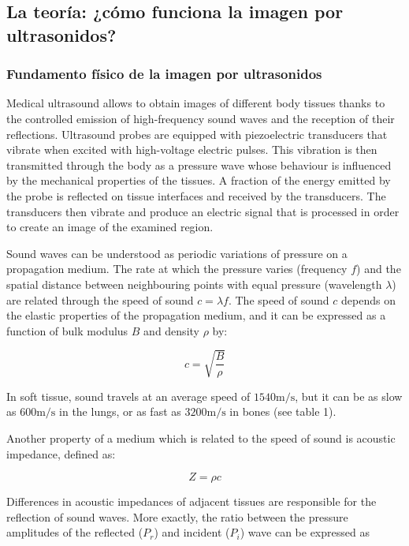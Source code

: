 \documentclass[11pt]{article} %
\begin{document}
\subsection{La teoría: ¿cómo funciona la imagen por ultrasonidos?}
\subsubsection{Fundamento físico de la imagen por ultrasonidos}


	Medical ultrasound allows to obtain images of different body tissues thanks to the controlled emission of high-frequency sound waves and the reception of their reflections. Ultrasound probes are equipped with piezoelectric transducers that vibrate when excited with high-voltage electric pulses. This vibration is then transmitted through the body as a pressure wave whose behaviour is influenced by the mechanical properties of the tissues. A fraction of the energy emitted by the probe is reflected on tissue interfaces and received by the transducers. The transducers then vibrate and produce an electric signal that is processed in order to create an image of the examined region. 
	
	
	Sound waves can be understood as periodic variations of pressure on a propagation medium. The rate at which the pressure varies (frequency $f$) and the spatial distance between neighbouring points with equal pressure (wavelength $\lambda$) are related through the speed of sound $c = \lambda f$. The speed of sound $c$ depends on the elastic properties of the propagation medium, and it can be expressed as a function of bulk modulus $B$ and density $\rho$ by:
	
	\[  c = \sqrt{ \frac{B}{\rho} } \]
	
	In soft tissue, sound travels at an average speed of $ 1540 \si{\meter\per\second} $, but it can be as slow as $ 600 \si{\meter\per\second} $ in the lungs, or as fast as $ 3200 \si{\meter\per\second} $ in bones (see table 1). 
	
	
	Another property of a medium which is related to the speed of sound is acoustic impedance, defined as: 	
	
	\[ Z = \rho c \]
	 	
	Differences in acoustic impedances of adjacent tissues are responsible for the reflection of sound waves. More exactly, the ratio between the pressure amplitudes of the reflected ($P_r$) and incident ($P_i$) wave can be expressed as	
	
\end{document}
